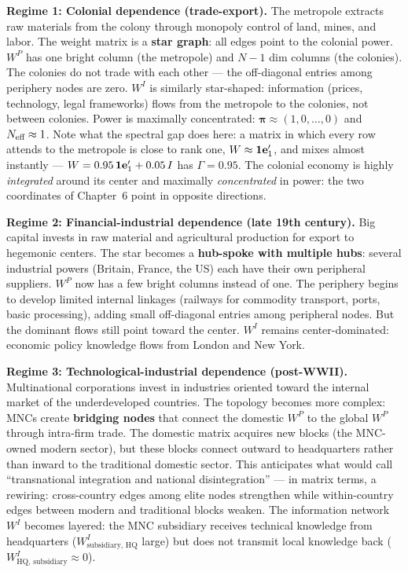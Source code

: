 \documentclass[../structural_economics_book.tex]{subfiles}
\begin{document}
\textbf{Regime 1: Colonial dependence (trade-export).} The metropole extracts raw materials from the colony through monopoly control of land, mines, and labor. The weight matrix is a \textbf{star graph}: all edges point to the colonial power. $W^P$ has one bright column (the metropole) and $N-1$ dim columns (the colonies). The colonies do not trade with each other --- the off-diagonal entries among periphery nodes are zero. $W^I$ is similarly star-shaped: information (prices, technology, legal frameworks) flows from the metropole to the colonies, not between colonies. Power is maximally concentrated: $\boldsymbol{\pi} \approx (1, 0, \ldots, 0)$ and $N_{\text{eff}} \approx 1$. Note what the spectral gap does here: a matrix in which every row attends to the metropole is close to rank one, $W \approx \mathbf{1}\mathbf{e}_1'$, and mixes almost instantly --- $W = 0.95\,\mathbf{1}\mathbf{e}_1' + 0.05\,I$ has $\Gamma = 0.95$. The colonial economy is highly \textit{integrated} around its center and maximally \textit{concentrated} in power: the two coordinates of Chapter~6 point in opposite directions.

\textbf{Regime 2: Financial-industrial dependence (late 19th century).} Big capital invests in raw material and agricultural production for export to hegemonic centers. The star becomes a \textbf{hub-spoke with multiple hubs}: several industrial powers (Britain, France, the US) each have their own peripheral suppliers. $W^P$ now has a few bright columns instead of one. The periphery begins to develop limited internal linkages (railways for commodity transport, ports, basic processing), adding small off-diagonal entries among peripheral nodes. But the dominant flows still point toward the center. $W^I$ remains center-dominated: economic policy knowledge flows from London and New York.

\textbf{Regime 3: Technological-industrial dependence (post-WWII).} Multinational corporations invest in industries oriented toward the internal market of the underdeveloped countries. The topology becomes more complex: MNCs create \textbf{bridging nodes} that connect the domestic $W^P$ to the global $W^P$ through intra-firm trade. The domestic matrix acquires new blocks (the MNC-owned modern sector), but these blocks connect outward to headquarters rather than inward to the traditional domestic sector. This anticipates what \citet{sunkel1971capitalismo} would call ``transnational integration and national disintegration'' --- in matrix terms, a rewiring: cross-country edges among elite nodes strengthen while within-country edges between modern and traditional blocks weaken. The information network $W^I$ becomes layered: the MNC subsidiary receives technical knowledge from headquarters ($W^I_{\text{subsidiary, HQ}}$ large) but does not transmit local knowledge back ($W^I_{\text{HQ, subsidiary}} \approx 0$).
\end{document}
